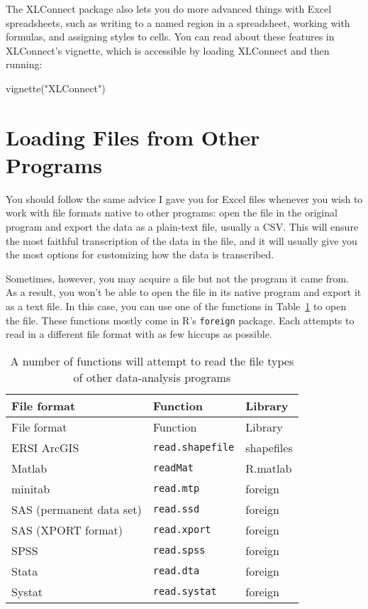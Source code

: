 \documentclass[
  letterpaper,
  DIV=11,
  numbers=noendperiod]{scrbook}
\newenvironment{Shaded}{\begin{snugshade}}{\end{snugshade}}
\newcommand{\FunctionTok}[1]{\textcolor[rgb]{0.28,0.35,0.67}{#1}}
\newcommand{\NormalTok}[1]{\textcolor[rgb]{0.00,0.23,0.31}{#1}}
\newcommand{\StringTok}[1]{\textcolor[rgb]{0.13,0.47,0.30}{#1}}
\begin{document}
The XLConnect package also lets you do more advanced things with Excel
spreadsheets, such as writing to a named region in a spreadsheet,
working with formulas, and assigning styles to cells. You can read about
these features in XLConnect's vignette, which is accessible by loading
XLConnect and then running:

\begin{Shaded}
\begin{Highlighting}[]
\FunctionTok{vignette}\NormalTok{(}\StringTok{"XLConnect"}\NormalTok{)}
\end{Highlighting}
\end{Shaded}

\section{Loading Files from Other
Programs}\label{loading-files-from-other-programs}

You should follow the same advice I gave you for Excel files whenever
you wish to work with file formats native to other programs: open the
file in the original program and export the data as a plain-text file,
usually a CSV. This will ensure the most faithful transcription of the
data in the file, and it will usually give you the most options for
customizing how the data is transcribed.

Sometimes, however, you may acquire a file but not the program it came
from. As a result, you won't be able to open the file in its native
program and export it as a text file. In this case, you can use one of
the functions in Table~\ref{tbl-others} to open the file. These
functions mostly come in R's \texttt{foreign} package. Each attempts to
read in a different file format with as few hiccups as possible.

\begin{longtable}[]{@{}lll@{}}
\caption{A number of functions will attempt to read the file types of
other data-analysis programs}\label{tbl-others}\tabularnewline
\toprule\noalign{}
File format & Function & Library \\
\midrule\noalign{}
\endfirsthead
\toprule\noalign{}
File format & Function & Library \\
\midrule\noalign{}
\endhead
\bottomrule\noalign{}
\endlastfoot
ERSI ArcGIS & \texttt{read.shapefile} & shapefiles \\
Matlab & \texttt{readMat} & R.matlab \\
minitab & \texttt{read.mtp} & foreign \\
SAS (permanent data set) & \texttt{read.ssd} & foreign \\
SAS (XPORT format) & \texttt{read.xport} & foreign \\
SPSS & \texttt{read.spss} & foreign \\
Stata & \texttt{read.dta} & foreign \\
Systat & \texttt{read.systat} & foreign \\
\end{longtable}
\end{document}
